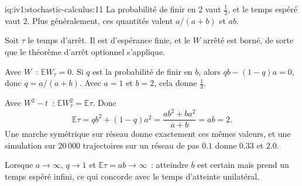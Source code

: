 \begin{solution}{iq:iv1:stochastic-calculus:11}
La probabilité de finir en 2 vaut $\frac13$, et le temps espéré vaut 2. Plus généralement, ces quantités valent $a/(a + b)$ et $ab$.

Soit $\tau$ le temps d'arrêt. Il est d'espérance finie, et le $W$ arrêté est borné, de sorte que le théorème d'arrêt optionnel s'applique.

Avec $W$~: $\mathbb{E}W_\tau = 0$. Si $q$ est la probabilité de finir en $b$, alors $qb - (1 - q)a = 0$, donc $q = a/(a + b)$. Avec $a = 1$ et $b = 2$, cela donne $\frac13$.

Avec $W^2 - t$~: $\mathbb{E}W_\tau^2 = \mathbb{E}\tau$. Donc
\[
\mathbb{E}\tau = qb^2 + (1 - q)a^2 = \frac{ab^2 + ba^2}{a + b} = ab = 2.
\]
Une marche symétrique sur réseau donne exactement ces mêmes valeurs, et une simulation sur $20\,000$ trajectoires sur un réseau de pas $0.1$ donne $0.33$ et $2.0$.

Lorsque $a \to \infty$, $q \to 1$ et $\mathbb{E}\tau = ab \to \infty$~: atteindre $b$ est certain mais prend un temps espéré infini, ce qui concorde avec le temps d'atteinte unilatéral.



\end{solution}

